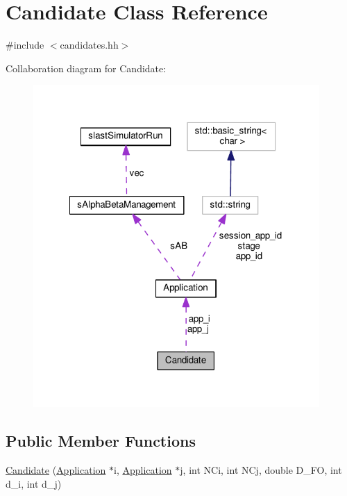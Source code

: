 \hypertarget{classCandidate}{\section{Candidate Class Reference}
\label{classCandidate}
}


{\ttfamily \#include $<$candidates.\-hh$>$}



Collaboration diagram for Candidate\-:\nopagebreak
\begin{figure}[H]
\begin{center}
\leavevmode
\includegraphics[width=309pt]{classCandidate__coll__graph}
\end{center}
\end{figure}
\subsection*{Public Member Functions}
\begin{DoxyCompactItemize}
\item 
\hyperlink{classCandidate_a2d1453a6b8c1a39561e67a2c67b79ed1}{Candidate} (\hyperlink{classApplication}{Application} $\ast$i, \hyperlink{classApplication}{Application} $\ast$j, int N\-Ci, int N\-Cj, double D\-\_\-\-F\-O, int d\-\_\-i, int d\-\_\-j)
\end{DoxyCompactItemize}
